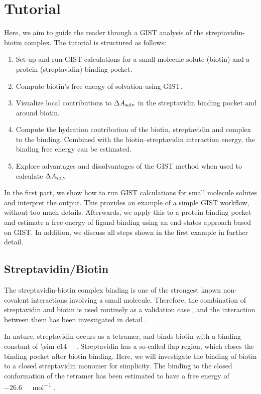 \documentclass[9pt,tutorial]{livecoms}
\newcommand{\dasolv}{\Delta A_\textup{solv}}
\begin{document}
\pagebreak
\section{Tutorial}
Here, we aim to guide the reader through a GIST analysis of the streptavidin-biotin complex.
The tutorial is structured as follows:
\begin{enumerate}
	\item Set up and run GIST calculations for a small molecule solute (biotin) and a protein (streptavidin) binding pocket.
	\item Compute biotin's free energy of solvation using GIST.
	\item Visualize local contributions to $\dasolv$ in the streptavidin binding pocket and around biotin.
	\item Compute the hydration contribution of the biotin, streptavidin and complex to the binding. Combined with the biotin--streptavidin interaction energy, the binding free energy can be estimated.
	\item Explore advantages and disadvantages of the GIST method when used to calculate $\dasolv$
\end{enumerate}
In the first part, we show how to run GIST calculations for small molecule solutes and interpret the output. This provides an example of a simple GIST workflow, without too much details.
Afterwards, we apply this to a protein binding pocket and estimate a free energy of ligand binding using an end-states approach based on GIST. In addition, we discuss all steps shown in the first example in further detail. 


\subsection{Streptavidin/Biotin}
The streptavidin-biotin complex binding is one of the strongest known non-covalent interactions involving a small molecule.
Therefore, the combination of streptavidin and biotin is used routinely as a validation case \cite{Dundas2013-streptavidin-review}, and the interaction between them has been investigated in detail \cite{McConnell2021-biotin}.

\newcommand{\appr}{{\mathord{\sim}}}
In nature, streptavidin occurs as a tetramer, and binds biotin with a binding constant of \qty{\sim e14}{\per\Molar} \cite{Dundas2013-streptavidin-review}.
Streptavidin has a so-called flap region, which closes the binding pocket after biotin binding.
Here, we will investigate the binding of biotin to a closed streptavidin monomer for simplicity.
The binding to the closed conformation of the tetramer has been estimated to have a free energy of \qty{-26.6}{\kilo\calorie\per\mol} \cite{Bansal2018-biotin}.
\end{document}
